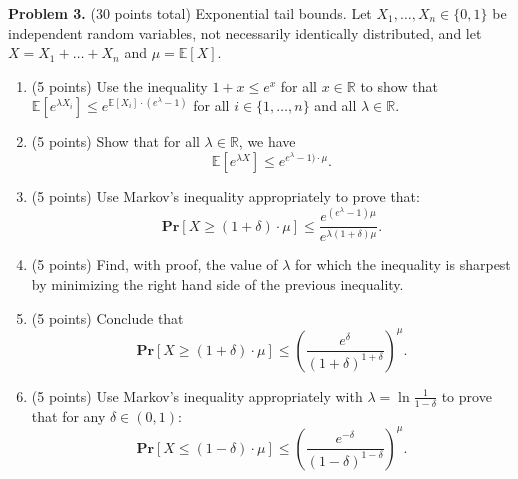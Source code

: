 \documentclass[11pt]{article}
\newcommand{\Ex}[1]{\ensuremath{\mathbb{E}\left[#1\right]}}
\newcommand{\PPr}[1]{\ensuremath{\mathbf{Pr}\left[#1\right]}}
\begin{document}
\vskip 0.2in\noindent
\textbf{Problem 3.} (30 points total)
Exponential tail bounds.
\vskip 0.1in\noindent
Let $X_1,\ldots,X_n\in\{0,1\}$ be independent random variables, not necessarily identically distributed, and let $X=X_1+\ldots+X_n$ and $\mu=\Ex{X}$. 
\begin{enumerate}
\item (5 points)
Use the inequality $1+x\le e^x$ for all $x\in\mathbb{R}$ to show that $\Ex{e^{\lambda X_i}}\le e^{\Ex{X_i}\cdot(e^\lambda-1)}$ for all $i\in\{1,\ldots,n\}$ and all $\lambda\in\mathbb{R}$. 
\item (5 points)
Show that for all $\lambda\in\mathbb{R}$, we have 
\[\Ex{e^{\lambda X}}\le e^{e^\lambda-1)\cdot\mu}.\]
\item (5 points)
Use Markov's inequality appropriately to prove that:
\[\PPr{X\ge(1+\delta)\cdot\mu}\le\frac{e^{(e^\lambda-1)\mu}}{e^{\lambda(1+\delta)\mu}}.\]
\item (5 points)
Find, with proof, the value of $\lambda$ for which the inequality is sharpest by minimizing the right hand side of the previous inequality. 
\item (5 points)
Conclude that
\[\PPr{X\ge(1+\delta)\cdot\mu}\le\left(\frac{e^{\delta}}{(1+\delta)^{1+\delta}}\right)^\mu.\]
\item (5 points)
Use Markov's inequality appropriately with $\lambda=\ln\frac{1}{1-\delta}$ to prove that for any $\delta\in(0,1)$:
\[\PPr{X\le(1-\delta)\cdot\mu}\le\left(\frac{e^{-\delta}}{(1-\delta)^{1-\delta}}\right)^\mu.\]
\end{enumerate}
\end{document}
